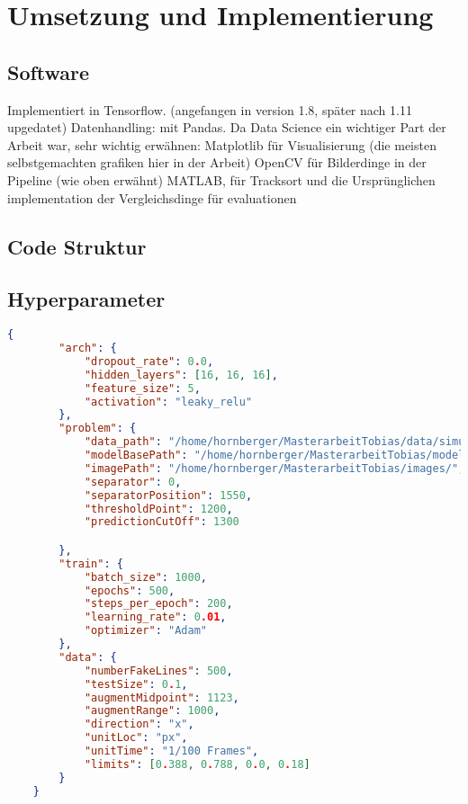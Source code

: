 \chapter{Umsetzung und Implementierung}

\section{Software}

Implementiert in Tensorflow. (angefangen in version 1.8, später nach 1.11 upgedatet)
Datenhandling: mit Pandas. Da Data Science ein wichtiger Part der Arbeit war, sehr wichtig
erwähnen:
Matplotlib für Visualisierung (die meisten selbstgemachten grafiken hier in der Arbeit)
OpenCV für Bilderdinge in der Pipeline (wie oben erwähnt)
MATLAB, für Tracksort und die Ursprünglichen implementation der Vergleichsdinge für evaluationen 


\section{Code Struktur}


\section{Hyperparameter}

\begin{lstlisting}[language=json,firstnumber=1, caption={Beispiel eines Hyperparameter Files in JSON}, captionpos=b, label=lst-hyperparam]
    {
        "arch": {
            "dropout_rate": 0.0,
            "hidden_layers": [16, 16, 16],
            "feature_size": 5,
            "activation": "leaky_relu"
        },
        "problem": {
            "data_path": "/home/hornberger/MasterarbeitTobias/data/simulated/SpheresDownsampled",
            "modelBasePath": "/home/hornberger/MasterarbeitTobias/models/simulated/",
            "imagePath": "/home/hornberger/MasterarbeitTobias/images/",
            "separator": 0,
            "separatorPosition": 1550,
            "thresholdPoint": 1200,
            "predictionCutOff": 1300

        },
        "train": {
            "batch_size": 1000,
            "epochs": 500,
            "steps_per_epoch": 200,
            "learning_rate": 0.01,
            "optimizer": "Adam"
        },
        "data": {
            "numberFakeLines": 500,
            "testSize": 0.1,
            "augmentMidpoint": 1123,
            "augmentRange": 1000,
            "direction": "x",
            "unitLoc": "px",
            "unitTime": "1/100 Frames",    
            "limits": [0.388, 0.788, 0.0, 0.18]
        }
    }

    
\end{lstlisting}
    

